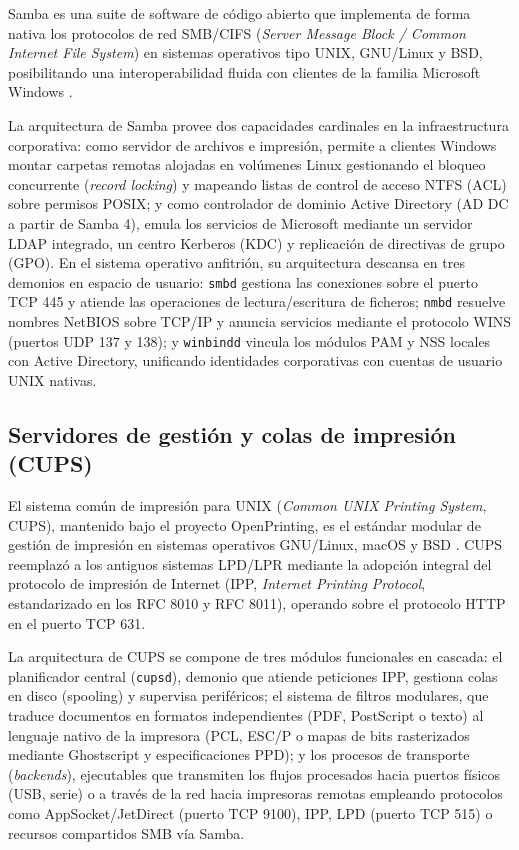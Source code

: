 \documentclass[12pt]{article}
\begin{document}
Samba es una suite de software de código abierto que implementa de forma nativa los protocolos de red SMB/CIFS (\textit{Server Message Block / Common Internet File System}) en sistemas operativos tipo UNIX, GNU/Linux y BSD, posibilitando una interoperabilidad fluida con clientes de la familia Microsoft Windows \parencite{sambaProject}.

La arquitectura de Samba provee dos capacidades cardinales en la infraestructura corporativa: como servidor de archivos e impresión, permite a clientes Windows montar carpetas remotas alojadas en volúmenes Linux gestionando el bloqueo concurrente (\textit{record locking}) y mapeando listas de control de acceso NTFS (ACL) sobre permisos POSIX; y como controlador de dominio Active Directory (AD DC a partir de Samba 4), emula los servicios de Microsoft mediante un servidor LDAP integrado, un centro Kerberos (KDC) y replicación de directivas de grupo (GPO). En el sistema operativo anfitrión, su arquitectura descansa en tres demonios en espacio de usuario: \texttt{smbd} gestiona las conexiones sobre el puerto TCP 445 y atiende las operaciones de lectura/escritura de ficheros; \texttt{nmbd} resuelve nombres NetBIOS sobre TCP/IP y anuncia servicios mediante el protocolo WINS (puertos UDP 137 y 138); y \texttt{winbindd} vincula los módulos PAM y NSS locales con Active Directory, unificando identidades corporativas con cuentas de usuario UNIX nativas.

\subsection{Servidores de gestión y colas de impresión (CUPS)}
\label{sec:servidoresCups}

El sistema común de impresión para UNIX (\textit{Common UNIX Printing System}, CUPS), mantenido bajo el proyecto OpenPrinting, es el estándar modular de gestión de impresión en sistemas operativos GNU/Linux, macOS y BSD \parencite{cupsProject}. CUPS reemplazó a los antiguos sistemas LPD/LPR mediante la adopción integral del protocolo de impresión de Internet (IPP, \textit{Internet Printing Protocol}, estandarizado en los RFC 8010 y RFC 8011), operando sobre el protocolo HTTP en el puerto TCP 631.

La arquitectura de CUPS se compone de tres módulos funcionales en cascada: el planificador central (\texttt{cupsd}), demonio que atiende peticiones IPP, gestiona colas en disco (spooling) y supervisa periféricos; el sistema de filtros modulares, que traduce documentos en formatos independientes (PDF, PostScript o texto) al lenguaje nativo de la impresora (PCL, ESC/P o mapas de bits rasterizados mediante Ghostscript y especificaciones PPD); y los procesos de transporte (\textit{backends}), ejecutables que transmiten los flujos procesados hacia puertos físicos (USB, serie) o a través de la red hacia impresoras remotas empleando protocolos como AppSocket/JetDirect (puerto TCP 9100), IPP, LPD (puerto TCP 515) o recursos compartidos SMB vía Samba.
\end{document}
